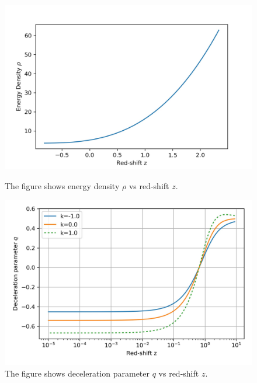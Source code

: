 \documentclass[8pt,hideothersubsections]{beamer}
\begin{document}
{\begin{frame}
\begin{figure}[ht]
    \begin{minipage}{0.49\linewidth}
		\centering
		\includegraphics[width=\textwidth]{Images/UDF_rho.jpg}
		\caption{The figure shows energy density $\rho$ vs red-shift $z$.}
		\label{fig:UDFRho}
    \end{minipage}
    \begin{minipage}{0.49\linewidth}
    	\vspace{10pt}
        \centering
        \includegraphics[width=\textwidth]{./Images/UDF_q.jpg}
		\caption{The figure shows deceleration parameter $q$ vs red-shift $z$.}
		\label{fig:Chq}
    \end{minipage}
\end{figure}
\end{frame}
}
\end{document}
